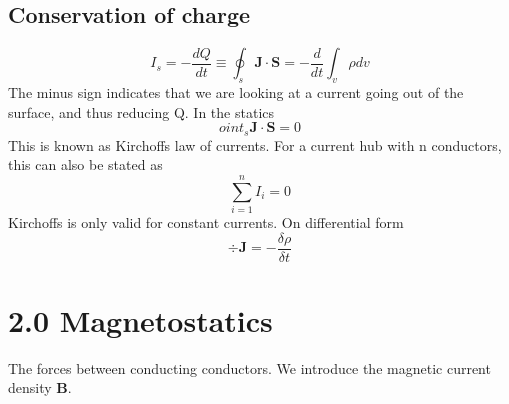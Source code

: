 \documentclass[
12pt, reprint, aip, onecolumn, notitlepage
]{revtex4-1}
\begin{document}
\subsection{Conservation of charge}
\begin{equation}
	I_s = -\dfrac{dQ}{dt} \equiv \oint_s \mathbf{J}\cdot \mathbf{S} = -\dfrac{d}{dt}\int_v\rho dv
\end{equation}
The minus sign indicates that we are looking at a current going out of the surface, and thus reducing Q. In the statics
\begin{equation}
	oint_s \mathbf{J}\cdot \mathbf{S} = 0
\end{equation}
This is known as Kirchoffs law of currents.
For a current hub with n conductors, this can also be stated as
\begin{equation}
	\sum_{i=1}^{n} I_i = 0
\end{equation}
Kirchoffs is only valid for constant currents. 
On differential form 
\begin{equation}
	\div{\mathbf{J}} = -\dfrac{\delta \rho}{\delta t}
\end{equation}

\section{2.0 Magnetostatics}
The forces between conducting conductors. We introduce the magnetic current density $\mathbf{B}$. 
\end{document}
